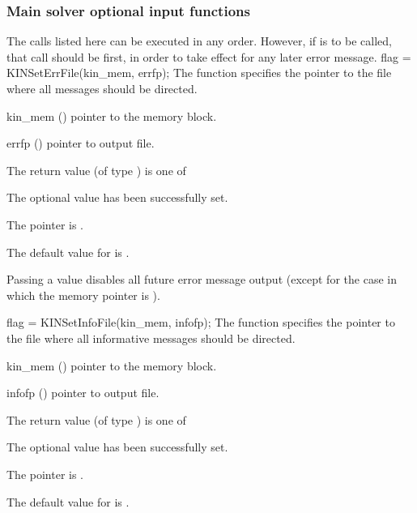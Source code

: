 \subsubsection{Main solver optional input functions}
The calls listed here can be executed in any order. However, if  
is to be called, that call should be first, in order to take effect for any later 
error message.
{
flag = KINSetErrFile(kin\_mem, errfp);
}
{
  The function  specifies the pointer to the file
  where all {\kinsol} messages should be directed.
}
{
  \begin{args}
  \item[kin\_mem] ()
    pointer to the {\kinsol} memory block.
  \item[errfp] ()
    pointer to output file.
  \end{args}
}
{
  The return value  (of type ) is one of
  \begin{args}
  \item[\Id{KIN\_SUCCESS}] 
    The optional value has been successfully set.
  \item[\Id{KIN\_MEM\_NULL}]
    The  pointer is .
  \end{args}
}
{
  The default value for  is .

  Passing a value  disables all future error message output
  (except for the case in which the {\kinsol} memory pointer is ).
}
{
flag = KINSetInfoFile(kin\_mem, infofp);
}
{
  The function  specifies the pointer to the file
  where all informative messages should be directed.
}
{
  \begin{args}
  \item[kin\_mem] ()
    pointer to the {\kinsol} memory block.
  \item[infofp] ()
    pointer to output file.
  \end{args}
}
{
  The return value  (of type ) is one of
  \begin{args}
  \item[\Id{KIN\_SUCCESS}] 
    The optional value has been successfully set.
  \item[\Id{KIN\_MEM\_NULL}]
    The  pointer is .
  \end{args}
}
{
  The default value for  is .
}

